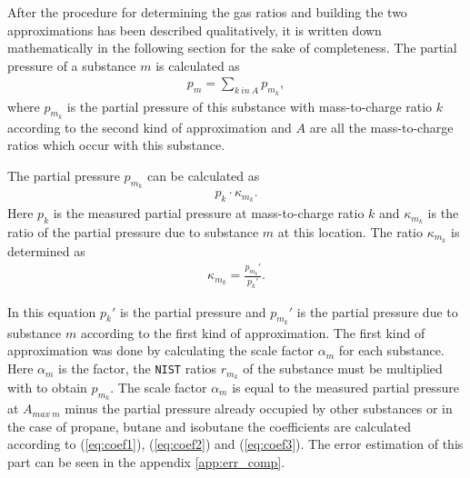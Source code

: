 After the procedure for determining the gas ratios and building the two approximations has been described qualitatively, it is written down mathematically in the following section for the sake of completeness. 
The partial pressure of a substance $m$ is calculated as
\begin{align}
   p_m = \sum_{k~in~A} {p_{m_k}}, 
\end{align}
where $p_{m_k}$ is the partial pressure of this substance with mass-to-charge ratio $k$ according to the second kind of approximation and $A$ are all the mass-to-charge ratios which occur with this substance. 


The partial pressure $p_{m_k}$ can be calculated as 
\begin{align}
    p_k\cdot \kappa_{m_k}.
\end{align}
 Here $p_k$ is the measured partial pressure at mass-to-charge ratio $k$ and $\kappa_{m_k}$ is the ratio of the partial pressure due to substance $m$ at this location. The ratio $\kappa_{m_k}$ is determined as 
 \begin{align}
     \kappa_{m_k} = \frac{p_{m_k}'}{p_{k}'}.
 \end{align}
 
In this equation $p_{k}'$ is the partial pressure and $p_{m_k}'$ is the partial pressure due to substance $m$ according to the first kind of approximation. The first kind of approximation was done by calculating the scale factor $\alpha_m$ for each substance. Here $\alpha_m$ is the factor, the \texttt{NIST} ratios $r_{m_k}$ of the substance must be multiplied with to obtain $p_{m_k}$. The scale factor $\alpha_m$ is equal to the measured partial pressure at $A_{{max}~m}$ minus the partial pressure already occupied by other substances or in the case of propane, butane and isobutane the coefficients are calculated according to (\ref{eq:coef1}), (\ref{eq:coef2}) and (\ref{eq:coef3}). The error estimation of this part can be seen in the appendix \ref{app:err_comp}. 






